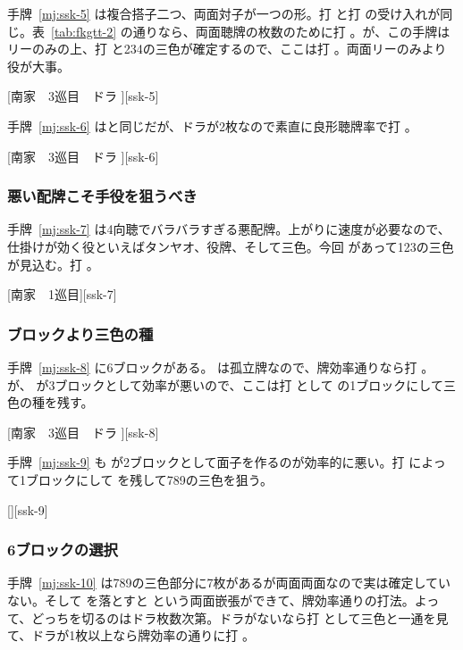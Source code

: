 \documentclass[../nankiru_main.tex]{subfiles}
\begin{document}
手牌~\ref{mj:ssk-5} は複合搭子二つ、両面対子が一つの形。打  と打  の受け入れが同じ。表~\ref{tab:fkgtt-2} の通りなら、両面聴牌の枚数のために打 。が、この手牌はリーのみの上、打  と234の三色が確定するので、ここは打 。両面リーのみより役が大事\citep[][p.~65]{zero-teyaku}。

[南家　3巡目　ドラ ][ssk-5]

手牌~\ref{mj:ssk-6} はと同じだが、ドラが2枚なので素直に良形聴牌率で打  \citep[][p.~65]{zero-teyaku}。

[南家　3巡目　ドラ ][ssk-6]


\subsubsection*{悪い配牌こそ手役を狙うべき}

手牌~\ref{mj:ssk-7} は4向聴でバラバラすぎる悪配牌。上がりに速度が必要なので、仕掛けが効く役といえばタンヤオ、役牌、そして三色。今回  があって123の三色が見込む。打  \citep[][p.~64]{zero-teyaku}。

[南家　1巡目][ssk-7]


\subsubsection*{ブロックより三色の種}

手牌~\ref{mj:ssk-8} に6ブロックがある。 は孤立牌なので、牌効率通りなら打 。が、 が3ブロックとして効率が悪いので、ここは打  として  の1ブロックにして三色の種を残す\citep[][p.~64]{zero-teyaku}。

[南家　3巡目　ドラ ][ssk-8]

手牌~\ref{mj:ssk-9} も  が2ブロックとして面子を作るのが効率的に悪い。打  によって1ブロックにして  を残して789の三色を狙う\citep{gendai-ssk}。

[][ssk-9]


\subsubsection*{6ブロックの選択}

手牌~\ref{mj:ssk-10} は789の三色部分に7枚があるが両面両面なので実は確定していない。そして  を落とすと  という両面嵌張ができて、牌効率通りの打法。よって、どっちを切るのはドラ枚数次第。ドラがないなら打  として三色と一通を見て、ドラが1枚以上なら牌効率の通りに打  \citep{gendai-ssk}。
\end{document}
